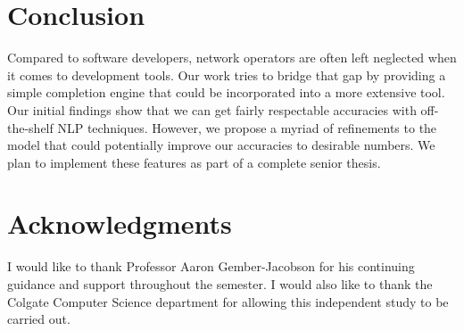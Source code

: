 \section{Conclusion}
Compared to software developers, network operators are often left neglected when it comes to development tools. Our work tries to bridge that gap by providing a simple completion engine that could be incorporated into a more extensive tool. Our initial findings show that we can get fairly respectable accuracies with off-the-shelf NLP techniques. However, we propose a myriad of refinements to the model that could potentially improve our accuracies to desirable numbers. We plan to implement these features as part of a complete senior thesis.

\section{Acknowledgments}
I would like to thank Professor Aaron Gember-Jacobson for his continuing guidance and support throughout the semester. I would also like to thank the Colgate Computer Science department for allowing this independent study to be carried out.
